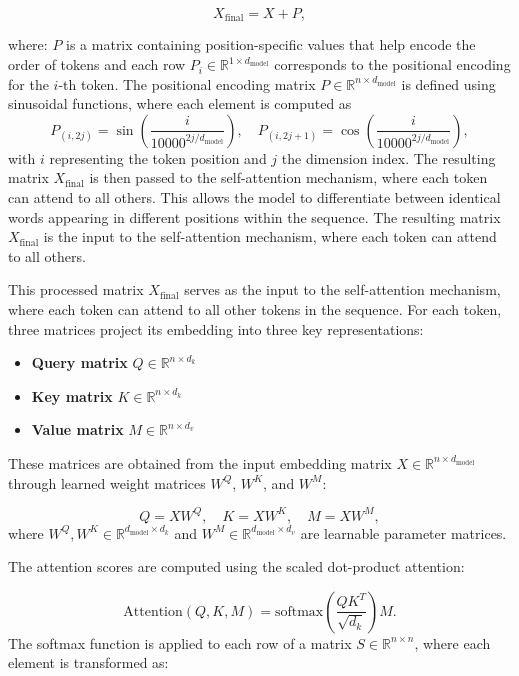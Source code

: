 \[
X_{\text{final}} = X + P,
\]

where: \( P \) is a matrix containing position-specific values that help encode the order of tokens and each row \( P_i \in \mathbb{R}^{1 \times d_{\text{model}}} \) corresponds to the positional encoding for the \( i \)-th token.
The positional encoding matrix \( P \in \mathbb{R}^{n \times d_{\text{model}}} \) is defined using sinusoidal functions, where each element is computed as 
\[
P_{(i, 2j)} = \sin\left(\frac{i}{10000^{2j/d_{\text{model}}}}\right), \quad P_{(i, 2j+1)} = \cos\left(\frac{i}{10000^{2j/d_{\text{model}}}}\right),
\]
with \( i \) representing the token position and \( j \) the dimension index. The resulting matrix \( X_{\text{final}} \) is then passed to the self-attention mechanism, where each token can attend to all others. This allows the model to differentiate between identical words appearing in different positions within the sequence. The resulting matrix \( X_{\text{final}} \) is the input to the self-attention mechanism, where each token can attend to all others.
    
This processed matrix \( X_{\text{final}} \) serves as the input to the self-attention mechanism, where each token can attend to all other tokens in the sequence. For each token, three matrices project its embedding into three key representations:
\begin{itemize}
    \item \textbf{Query matrix} \( Q \in \mathbb{R}^{n \times d_k} \) 
    \item \textbf{Key matrix} \( K \in \mathbb{R}^{n \times d_k} \) 
    \item \textbf{Value matrix} \( M \in \mathbb{R}^{n \times d_v} \) 
\end{itemize}
These matrices are obtained from the input embedding matrix \( X \in \mathbb{R}^{n \times d_{\text{model}}} \) through learned weight matrices \( W^Q \), \( W^K \), and \( W^M \):

\begin{equation}
    Q = X W^Q, \quad K = X W^K, \quad M = X W^M,
\end{equation}
where \( W^Q, W^K \in \mathbb{R}^{d_{\text{model}} \times d_k} \) and \( W^M \in \mathbb{R}^{d_{\text{model}} \times d_v} \) are learnable parameter matrices.

The attention scores are computed using the scaled dot-product attention:

\begin{equation}
    \text{Attention}(Q, K, M) = \text{softmax} \left( \frac{Q K^T}{\sqrt{d_k}} \right) M.
\end{equation}
The softmax function is applied to each row of a matrix \( S \in \mathbb{R}^{n \times n} \), where each element is transformed as:

